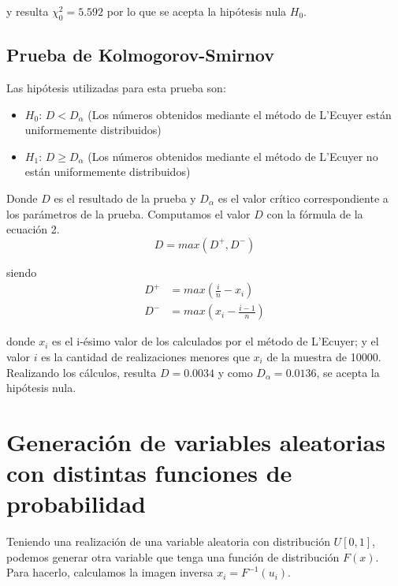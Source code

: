 \documentclass[10pt,journal,compsoc]{IEEEtran}
\begin{document}
y resulta $\chi_{0}^{2} = 5.592$ por lo que se acepta la hip\'otesis nula $H_0$.

\subsection{Prueba de Kolmogorov-Smirnov}
Las hip\'otesis utilizadas para esta prueba son:
\begin{itemize}
 \item {$H_{0}$:} $D < D_{\alpha}$ (Los n\'umeros obtenidos mediante el m\'etodo de L'Ecuyer est\'an uniformemente distribuidos)
 \item {$H_{1}$:} $D \ge D_{\alpha}$ (Los n\'umeros obtenidos mediante el m\'etodo de L'Ecuyer no est\'an uniformemente distribuidos)
\end{itemize}
Donde $D$ es el resultado de la prueba y $D_{\alpha}$ es el valor cr\'itico correspondiente a los par\'ametros de la prueba.
Computamos el valor $D$ con la f\'ormula de la ecuaci\'on 2.
\begin{equation}
 D = max(D^{+}, D^{-})
\end{equation}

siendo
\begin{align}
 D^{+} &= max(\frac{i}{n}-x_i)\\
 D^{-} &= max(x_i - \frac{i-1}{n})
\end{align}

donde $x_i$ es el i-\'esimo valor de los calculados por el m\'etodo de L'Ecuyer; 
y el valor $i$ es la cantidad de realizaciones menores que $x_i$ de la muestra de 10000.
Realizando los c\'alculos, resulta $D = 0.0034$ y como $D_{\alpha} = 0.0136$,
 se acepta la hip\'otesis nula.

\section{Generaci\'on de variables aleatorias con distintas funciones de probabilidad}
Teniendo una realizaci\'on de una variable aleatoria con distribuci\'on $U[0,1]$, podemos generar otra variable que tenga
una funci\'on de distribuci\'on $F(x)$. Para hacerlo, calculamos la imagen inversa $x_i = F^{-1}(u_i)$.
\end{document}
